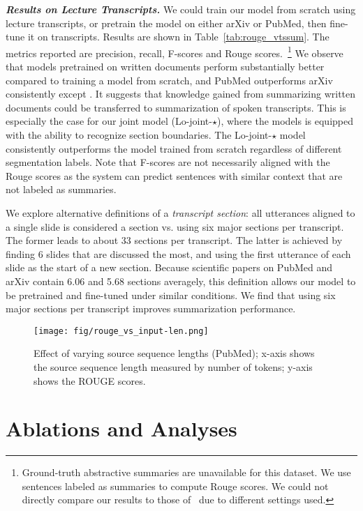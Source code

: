 \documentclass[11pt]{article}
\begin{document}
\vspace{0.05in}
\noindent\textbf{\textsl{Results on Lecture Transcripts.}}\quad
We could train our model from scratch using lecture transcripts, or pretrain the model on either arXiv or PubMed, then fine-tune it on transcripts.
Results are shown in Table~\ref{tab:rouge_vtssum}.
The metrics reported are precision, recall, F-scores and Rouge scores.~\footnote{
Ground-truth abstractive summaries are unavailable for this dataset.
We use sentences labeled as summaries to compute Rouge scores.
We could not directly compare our results to those of~\cite{lv2021vt} due to different settings used. 
} 
We observe that models pretrained on written documents perform substantially better 
compared to training a model from scratch, and PubMed outperforms arXiv consistently except .
It suggests that knowledge gained from summarizing written documents could be transferred to summarization of spoken transcripts. 
This is especially the case for our joint model (Lo-joint-$\star$),
where the models is equipped with the ability to recognize section boundaries.
The Lo-joint-$\star$ model consistently outperforms the model trained from scratch regardless of different segmentation labels.
Note that F-scores are not necessarily aligned with the Rouge scores as the system can predict sentences with similar context that are not labeled as summaries.


We explore alternative definitions of a \emph{transcript section}:
all utterances aligned to a single slide is considered a section vs.
using six major sections per transcript.
The former leads to about 33 sections per transcript. 
The latter is achieved by finding 6 slides that are discussed the most,
and using the first utterance of each slide as the start of a new section. 
Because scientific papers on PubMed and arXiv contain 6.06 and 5.68 sections averagely,
this definition allows our model to be pretrained and fine-tuned 
under similar conditions.
We find that using six major sections per transcript improves summarization performance.



\begin{figure}[t]	
\centering
\texttt{[image: fig/rouge\_vs\_input-len.png]}
\caption{
Effect of varying source sequence lengths (PubMed);
x-axis shows the source sequence length measured by number of tokens;
y-axis shows the ROUGE scores.
}
\label{fig:rouge_by_seqlen}
\end{figure}


\section{Ablations and Analyses}
\label{sec:ablation}
\end{document}
